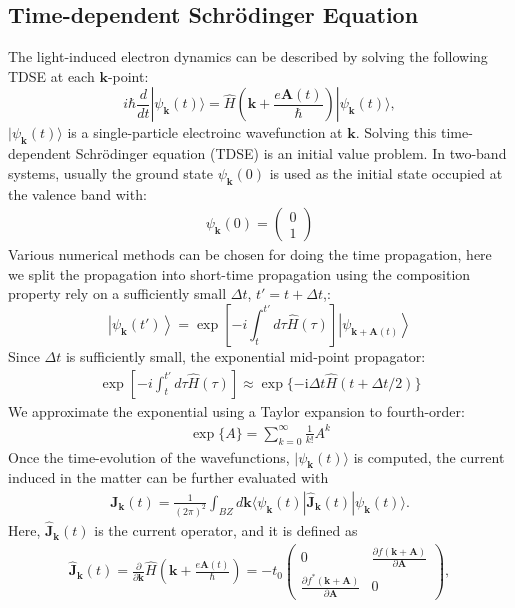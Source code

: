 \subsection{Time-dependent Schr\"odinger Equation}
The light-induced electron dynamics can be described by solving the following \gls {TDSE} at each $\mathbf k$-point:
\begin{equation}
i\hbar \frac{d}{dt}| \psi_{\mathbf {k}}(t) \rangle = \hat{H}\left ( \mathbf k + \frac{e\mathbf A(t)}{\hbar} \right )| \psi_{\mathbf k}(t) \rangle,
\label{eqn:TDSE}
\end{equation}
$|\psi_{\mathbf k}(t)\rangle$ is a single-particle electroinc wavefunction at $\mathbf k$.
Solving this time-dependent Schr\"odinger equation (\gls {TDSE}) is an initial value problem. In two-band systems, usually the ground state $\psi_{\mathbf k}(0)$ is used as the initial state occupied at the valence band with:
\begin{align}
\psi_{\mathbf k}(0) = \left(\begin{array}{cc}
0 \\
1
\end{array}\right)
\end{align}
Various numerical methods can be chosen for doing the time propagation, here we split the propagation into short-time propagation using the composition property rely on a sufficiently small $\Delta t$, $t'=t+\Delta t$,:
\begin{equation}
\left|\psi_{\mathbf{k}}(t')\right\rangle=\exp \left[-i \int_{t}^{t'} d \tau \hat{H}(\tau) \right]\left|\psi_{\mathbf{k}+\mathbf{A}(t)}\right\rangle
\label{eqn:deltat}
\end{equation}
Since $\Delta t$ is sufficiently small, the exponential mid-point propagator:
\begin{align}
 \exp \left[-i \int_{t}^{t'} d \tau \hat{H}(\tau) \right] \approx  \exp \{-\mathrm{i} \Delta t \hat{H}(t+\Delta t / 2)\}
\end{align}
We approximate the exponential using a Taylor expansion to fourth-order:
\begin{align}
\exp \{A\}=\sum_{k=0}^{\infty} \frac{1}{k!} A^k
\end{align}
Once the time-evolution of the wavefunctions, $|\psi_{\mathbf k}(t)\rangle$ is computed, the current induced in the matter can be further evaluated with
\begin{align}
\mathbf{J}_{\mathbf k}(t)=\frac{1}{(2\pi)^2} \int_{BZ} d\mathbf k\langle \psi_{\mathbf k}(t)|\hat{\mathbf J}_{\mathbf k}(t)| \psi_{\mathbf{k}}(t)\rangle.
\label{eq:current}
\end{align}
Here, $\hat {\mathbf J}_{\mathbf k}(t)$ is the current operator, and it is defined as
\begin{align}
\hat {\mathbf J}_{\mathbf k}(t) = \frac{\partial }{\partial \mathbf k}\hat H \left (\mathbf k + \frac{e\mathbf A(t)}{\hbar} \right ) = 
-t_0 \left(\begin{array}{cc}
0 & \frac{\partial f(\mathbf{k}+\mathbf{A})}{\partial \mathbf A} \\
\frac{\partial f^*(\mathbf{k}+\mathbf{A})}{\partial \mathbf A}  & 0
\end{array}\right),
\end{align}

